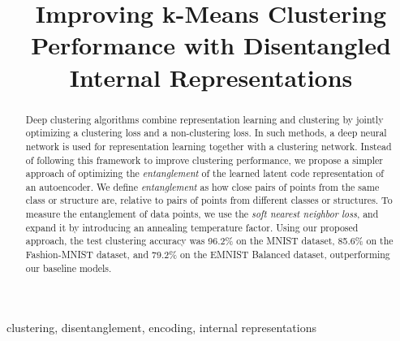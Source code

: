 \documentclass[conference]{IEEEtran}
\begin{document}
\title{
Improving k-Means Clustering Performance with Disentangled Internal Representations
}

\author{
\and
{}
}

\maketitle

\begin{abstract}
Deep clustering algorithms combine representation learning and clustering by jointly optimizing a clustering loss and a non-clustering loss. In such methods, a deep neural network is used for representation learning together with a clustering network. Instead of following this framework to improve clustering performance, we propose a simpler approach of optimizing the \textit{entanglement} of the learned latent code representation of an autoencoder. We define \textit{entanglement} as how close pairs of points from the same class or structure are, relative to pairs of points from different classes or structures. To measure the entanglement of data points, we use the \textit{soft nearest neighbor loss}, and expand it by introducing an annealing temperature factor. Using our proposed approach, the test clustering accuracy was 96.2\% on the MNIST dataset, 85.6\% on the Fashion-MNIST dataset, and 79.2\% on the EMNIST Balanced dataset, outperforming our baseline models.
\end{abstract}

\begin{IEEEkeywords}
clustering, disentanglement, encoding, internal representations
\end{IEEEkeywords}
\end{document}
